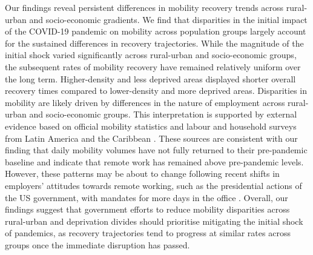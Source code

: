 \documentclass[fleqn,10pt]{wlscirep}
\begin{document}
Our findings reveal persistent differences in mobility recovery trends across rural-urban and socio-economic gradients. We find that disparities in the initial impact of the COVID-19 pandemic on mobility across population groups largely account for the sustained differences in recovery trajectories. While the magnitude of the initial shock varied significantly across rural-urban and socio-economic groups, the subsequent rates of mobility recovery have remained relatively uniform over the long term. Higher-density and less deprived areas displayed shorter overall recovery times compared to lower-density and more deprived areas. Disparities in mobility are likely driven by differences in the nature of employment \cite{ILO21} across rural-urban and socio-economic groups. This interpretation is supported by external evidence based on official mobility statistics and labour and household surveys from Latin America and the Caribbean \cite{OMSV2026BA, DANE2025, ILO2023PanoramaLaboral, BertranouGontero2024LACWork}. These sources are consistent with our finding that daily mobility volumes have not fully returned to their pre-pandemic baseline and indicate that remote work has remained above pre-pandemic levels. However, these patterns may be about to change following recent shifts in employers' attitudes towards remote working, such as the presidential actions of the US government, with mandates for more days in the office \cite{WhiteHouse2025Return, CIPD2025LMO}. Overall, our findings suggest that government efforts to reduce mobility disparities across rural-urban and deprivation divides should prioritise mitigating the initial shock of pandemics, as recovery trajectories tend to progress at similar rates across groups once the immediate disruption has passed.
\end{document}
